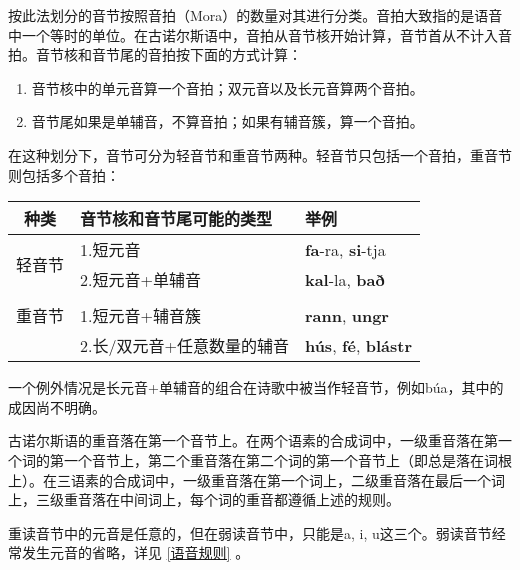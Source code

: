 按此法划分的音节按照音拍（Mora）的数量对其进行分类。音拍大致指的是语音中一个等时的单位。在古诺尔斯语中，音拍从音节核开始计算，音节首从不计入音拍。音节核和音节尾的音拍按下面的方式计算：

\begin{info}
  \begin{enumerate}
    \item 音节核中的单元音算一个音拍；双元音以及长元音算两个音拍。
    \item 音节尾如果是单辅音，不算音拍；如果有辅音簇，算一个音拍。
  \end{enumerate}
\end{info}

在这种划分下，音节可分为轻音节和重音节两种。轻音节只包括一个音拍，重音节则包括多个音拍：


\begin{table}[H]
  \centering
  \begin{tabular}{cll}
    \hline
    \textbf{种类}           & \textbf{音节核和音节尾可能的类型} & \textbf{举例}                               \\ \hline
    \multirow{2}{*}{轻音节} & 1.短元音                          & \textbf{fa}-ra, \textbf{si}-tja             \\
                            & 2.短元音+单辅音                   & \textbf{kal}-la, \textbf{bað}               \\
    \multicolumn{1}{l}{}    & \multicolumn{1}{l}{}              & \multicolumn{1}{l}{}                        \\
    重音节                  & 1.短元音+辅音簇                   & \textbf{rann}, \textbf{ungr}                \\
                            & 2.长/双元音+任意数量的辅音        & \textbf{hús}, \textbf{fé},  \textbf{blástr} \\ \hline
  \end{tabular}
\end{table}

一个例外情况是长元音+单辅音的组合在诗歌中被当作轻音节，例如búa，其中的成因尚不明确。

古诺尔斯语的重音落在第一个音节上。在两个语素的合成词中，一级重音落在第一个词的第一个音节上，第二个重音落在第二个词的第一个音节上（即总是落在词根上）。在三语素的合成词中，一级重音落在第一个词上，二级重音落在最后一个词上，三级重音落在中间词上，每个词的重音都遵循上述的规则。

重读音节中的元音是任意的，但在弱读音节中，只能是a, i, u这三个。弱读音节经常发生元音的省略，详见 \ref{语音规则} 。

